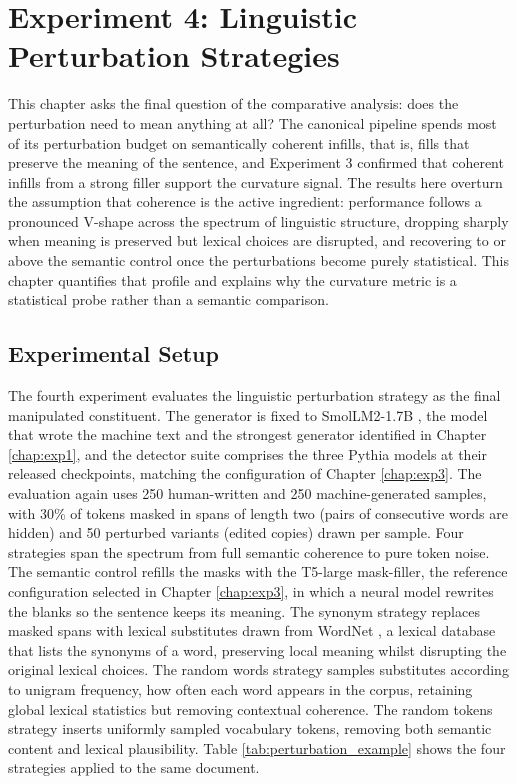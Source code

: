 \documentclass[logo,msc,cs]{infthesis}      %
\begin{document}
\chapter{Experiment 4: Linguistic Perturbation Strategies}
\label{chap:exp4}
This chapter asks the final question of the comparative analysis: does the perturbation need to mean anything at all? The canonical pipeline spends most of its perturbation budget on semantically coherent infills, that is, fills that preserve the meaning of the sentence, and Experiment 3 confirmed that coherent infills from a strong filler support the curvature signal. The results here overturn the assumption that coherence is the active ingredient: performance follows a pronounced V-shape across the spectrum of linguistic structure, dropping sharply when meaning is preserved but lexical choices are disrupted, and recovering to or above the semantic control once the perturbations become purely statistical. This chapter quantifies that profile and explains why the curvature metric is a statistical probe rather than a semantic comparison.

\section{Experimental Setup}
\label{sec:exp4_setup}
The fourth experiment evaluates the linguistic perturbation strategy as the final manipulated constituent. The generator is fixed to SmolLM2-1.7B \citep{allal2024smollm}, the model that wrote the machine text and the strongest generator identified in Chapter \ref{chap:exp1}, and the detector suite comprises the three Pythia models at their released checkpoints, matching the configuration of Chapter \ref{chap:exp3}. The evaluation again uses 250 human-written and 250 machine-generated samples, with 30\% of tokens masked in spans of length two (pairs of consecutive words are hidden) and 50 perturbed variants (edited copies) drawn per sample.
Four strategies span the spectrum from full semantic coherence to pure token noise. The semantic control refills the masks with the T5-large mask-filler, the reference configuration selected in Chapter \ref{chap:exp3}, in which a neural model rewrites the blanks so the sentence keeps its meaning. The synonym strategy replaces masked spans with lexical substitutes drawn from WordNet \citep{miller1995wordnet}, a lexical database that lists the synonyms of a word, preserving local meaning whilst disrupting the original lexical choices. The random words strategy samples substitutes according to unigram frequency, how often each word appears in the corpus, retaining global lexical statistics but removing contextual coherence. The random tokens strategy inserts uniformly sampled vocabulary tokens, removing both semantic content and lexical plausibility. Table \ref{tab:perturbation_example} shows the four strategies applied to the same document.
\end{document}
